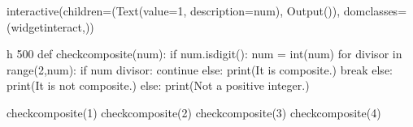 \documentclass[letterpaper,10pt,english]{sphinxmanual}
\begin{document}
\begin{sphinxVerbatim}[commandchars=\\\{\}]
 
     
          
           
               
\end{sphinxVerbatim}

\begin{sphinxVerbatim}[commandchars=\\\{\}]
interactive(children=(Text(value=\PYGZsq{}1\PYGZsq{}, description=\PYGZsq{}num\PYGZsq{}), Output()), \PYGZus{}dom\PYGZus{}classes=(\PYGZsq{}widget\PYGZhy{}interact\PYGZsq{},))
\end{sphinxVerbatim}

\begin{sphinxVerbatim}[commandchars=\\\{\}]
 \PYGZhy{}h 500 
def check\PYGZus{}composite(num):
    if num.isdigit():
        num = int(num)
        for divisor in range(2,num):
            if num \PYGZpc{} divisor:
                continue
            else:
                print(\PYGZsq{}It is composite.\PYGZsq{})
                break
        else:
            print(\PYGZsq{}It is not composite.\PYGZsq{})
    else:
        print(\PYGZsq{}Not a positive integer.\PYGZsq{})
        
check\PYGZus{}composite(\PYGZsq{}1\PYGZsq{})
check\PYGZus{}composite(\PYGZsq{}2\PYGZsq{})
check\PYGZus{}composite(\PYGZsq{}3\PYGZsq{})
check\PYGZus{}composite(\PYGZsq{}4\PYGZsq{})
\end{sphinxVerbatim}
\end{document}
